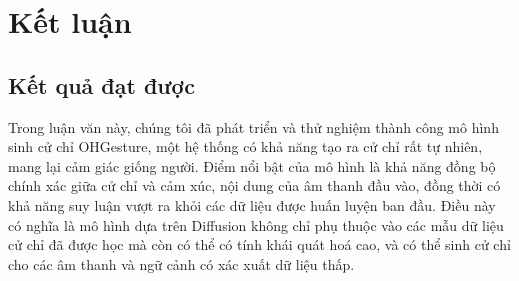 \chapter{Kết luận}
\label{Chapter5}

\section{Kết quả đạt được}

%
%

Trong luận văn này, chúng tôi đã phát triển và thử nghiệm thành công mô hình sinh cử chỉ OHGesture, một hệ thống có khả năng tạo ra cử chỉ rất tự nhiên, mang lại cảm giác giống người. Điểm nổi bật của mô hình là khả năng đồng bộ chính xác giữa cử chỉ và cảm xúc, nội dung của âm thanh đầu vào, đồng thời có khả năng suy luận vượt ra khỏi các dữ liệu được huấn luyện ban đầu. Điều này có nghĩa là mô hình dựa trên Diffusion  không chỉ phụ thuộc vào các mẫu dữ liệu cử chỉ đã được học mà còn có thể có tính khái quát hoá cao, và có thể sinh cử chỉ cho các âm thanh và ngữ cảnh có xác xuất dữ liệu thấp.


